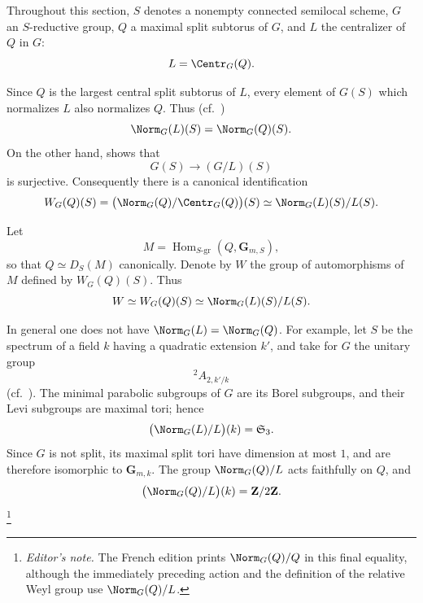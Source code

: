 

Throughout this section, \(S\) denotes a nonempty connected
semilocal scheme, \(G\) an \(S\)-reductive group, \(Q\) a maximal
split subtorus of \(G\), and \(L\) the centralizer of \(Q\) in \(G\):
\[
 L=\Centr_G(Q).
\]


Since \(Q\) is the largest central split subtorus of \(L\), every
element of \(G(S)\) which normalizes \(L\) also normalizes \(Q\).
Thus \textup{(cf.\ )}
\[
 \Norm_G(L)(S)=\Norm_G(Q)(S).
\]
On the other hand,  shows that
\[
 G(S)\longrightarrow(G/L)(S)
\]
is surjective.  Consequently there is a canonical identification
\[
 W_G(Q)(S)
 =\bigl(\Norm_G(Q)/\Centr_G(Q)\bigr)(S)
 \simeq\Norm_G(L)(S)/L(S).
\]

Let
\[
 M=\operatorname{Hom}_{S\text{-}\mathrm{gr}}
      (Q,\mathbf G_{m,S}),
\]
so that \(Q\simeq D_S(M)\) canonically.  Denote by \(W\) the group
of automorphisms of \(M\) defined by \(W_G(Q)(S)\).  Thus
\[
 W\simeq W_G(Q)(S)\simeq\Norm_G(L)(S)/L(S).
\]


In general one does not have
\(\Norm_G(L)=\Norm_G(Q)\).  For example, let \(S\) be the spectrum of
a field \(k\) having a quadratic extension \(k'\), and take for
\(G\) the unitary group
\[
 {}^2\!A_{2,k'/k}
\]
\textup{(cf.\ )}.  The minimal parabolic
subgroups of \(G\) are its Borel subgroups, and their Levi subgroups
are maximal tori; hence
\[
 \bigl(\Norm_G(L)/L\bigr)(k)=\mathfrak S_3.
\]
Since \(G\) is not split, its maximal split tori have dimension at
most \(1\), and are therefore isomorphic to \(\mathbf G_{m,k}\).
The group \(\Norm_G(Q)/L\) acts faithfully on \(Q\), and
\[
 \bigl(\Norm_G(Q)/L\bigr)(k)=\mathbf Z/2\mathbf Z.
\]
\footnote{\emph{Editor's note.} The French edition prints
\(\Norm_G(Q)/Q\) in this final equality, although the immediately
preceding action and the definition of the relative Weyl group use
\(\Norm_G(Q)/L\).}


